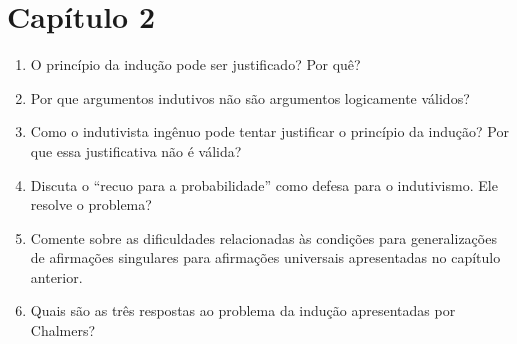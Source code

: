 \documentclass[10pt,a4paper]{extarticle}
\begin{document}
\section*{Capítulo 2}
\begin{enumerate}[resume, label=\textbf{\arabic*.}, itemsep=6pt]
  \item O princípio da indução pode ser justificado? Por quê?
  \item Por que argumentos indutivos não são argumentos logicamente válidos?
  \item Como o indutivista ingênuo pode tentar justificar o princípio da indução? Por que essa justificativa não é válida?
  \item Discuta o \enquote{recuo para a probabilidade} como defesa para o indutivismo. Ele resolve o problema?
  \item Comente sobre as dificuldades relacionadas às condições para generalizações de afirmações singulares para afirmações universais apresentadas no capítulo anterior.
  \item Quais são as três respostas ao problema da indução apresentadas por Chalmers?
\end{enumerate}



\end{document}
